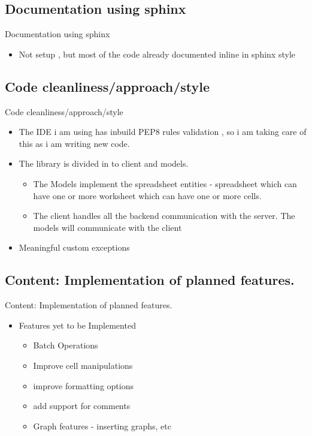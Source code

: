 \documentclass{beamer}
\begin{document}
\subsection{Documentation using sphinx }
\begin{frame}{Documentation using sphinx }
  \begin{itemize}
  
    \item {Not setup , but most of the code already documented inline in sphinx style}
  \end{itemize}
\end{frame}

\subsection{Code cleanliness/approach/style  }
\begin{frame}{Code cleanliness/approach/style  }
  \begin{itemize}
  
    \item {The IDE i am using has inbuild PEP8 rules validation , so i am taking care of this as i am writing new code.}
    \item{The library is divided in to client and models.}
      \begin{itemize}
        \item{The Models implement the spreadsheet entities -  spreadsheet which can have one or more worksheet which can have one or more cells.}
        \item{The client handles all the backend communication with the server. The models will communicate with the client}
      \end{itemize}

    \item{Meaningful  custom exceptions}
    
  \end{itemize}
\end{frame}

\subsection{Content: Implementation of planned features.}
\begin{frame}{Content: Implementation of planned features.}
  \begin{itemize}
    \item {Features yet to be Implemented}
        \begin{itemize}
            \item {Batch Operations}
            \item {Improve cell manipulations}
            \item {improve formatting options}
            \item {add support for comments}
            \item {Graph features - inserting graphs, etc}
        \end{itemize}
  \end{itemize}
\end{frame}
\end{document}
